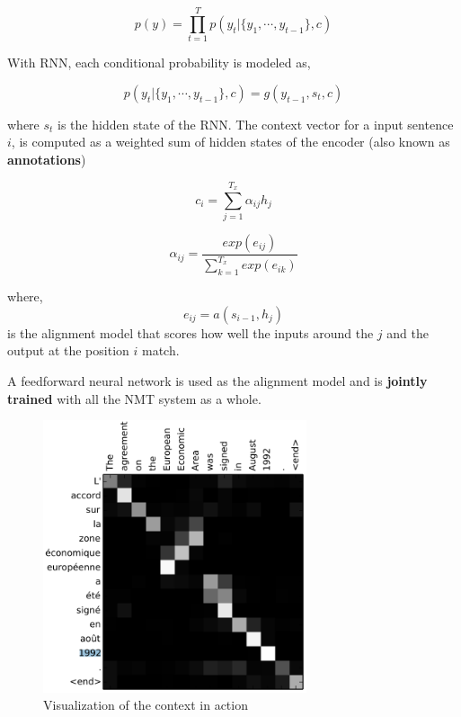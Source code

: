 \documentclass[a4paper]{article}
\begin{document}
\begin{equation*}
  p(y) = \prod^{T}_{t=1} p(y_t | \{ y_1, \cdots, y_{t-1}\} ,c )
\end{equation*}


With RNN, each conditional probability is modeled as,


\begin{equation*}
  p(y_t | \{ y_1, \cdots, y_{t-1}\}, c) = g(y_{t-1}, s_t, c)
\end{equation*}


where  $s_t$ is the hidden  state  of  the RNN. The context vector  for a  input
sentence $i$, is  computed  as  a weighted  sum of  hidden states of the encoder
(also known as \textbf{annotations})


\begin{equation*}
  c_i = \sum_{j=1}^{T_{x}} \alpha_{ij} h_j
\end{equation*}


\begin{equation*}
  \alpha_{ij} = \frac{ exp(e_{ij})}{ \sum_{k=1}^{T_x} exp (e_{ik})}
\end{equation*}

where, $$ e_{ij}  = a(s_{i-1},  h_j)  $$ is the alignment model that  scores how
well the inputs around the $j$ and the output at the position $i$ match.


A   feedforward  neural  network   is  used  as   the  alignment  model  and  is
\textbf{jointly trained} with all the NMT system as a whole.


\begin{figure}
  \includegraphics[height=8cm]{img/contextres.png}
  \caption{Visualization of the context in action}
  \label{fig:contextvis}
\end{figure}
\end{document}
